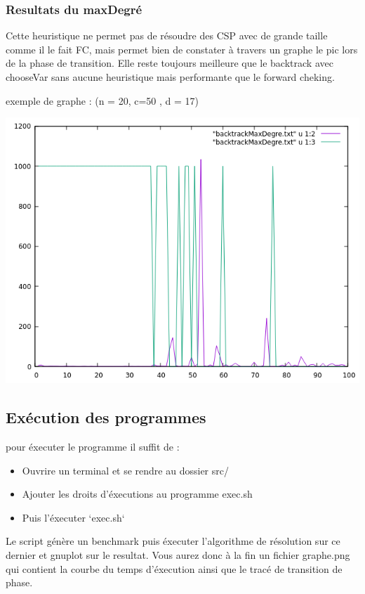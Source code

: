 \documentclass[oneside,13pt,a4paper]{article}
\begin{document}
\subsubsection{Resultats du maxDegré}
Cette heuristique ne permet pas de résoudre des CSP avec de grande taille comme il le fait FC, mais permet bien de constater à travers un graphe le pic lors de la phase de transition.
Elle reste toujours meilleure que le backtrack avec chooseVar sans aucune heuristique mais performante que le forward cheking.

exemple de graphe : (n = 20, c=50 , d = 17)

\includegraphics{img/backtrackMaxDegre.png}

\subsection{Exécution des programmes}
pour éxecuter le programme il suffit de :
\begin{itemize}	
	\item Ouvrire un terminal et se rendre au dossier src/
	\item Ajouter les droits d'éxecutions au programme exec.sh
	\item Puis l'éxecuter `exec.sh`
\end{itemize}

Le script génère un benchmark puis éxecuter l'algorithme de résolution sur ce dernier et gnuplot sur le resultat. Vous aurez donc à la fin un fichier graphe.png qui contient la courbe du temps d'éxecution ainsi que le tracé de transition de phase.
\end{document}
